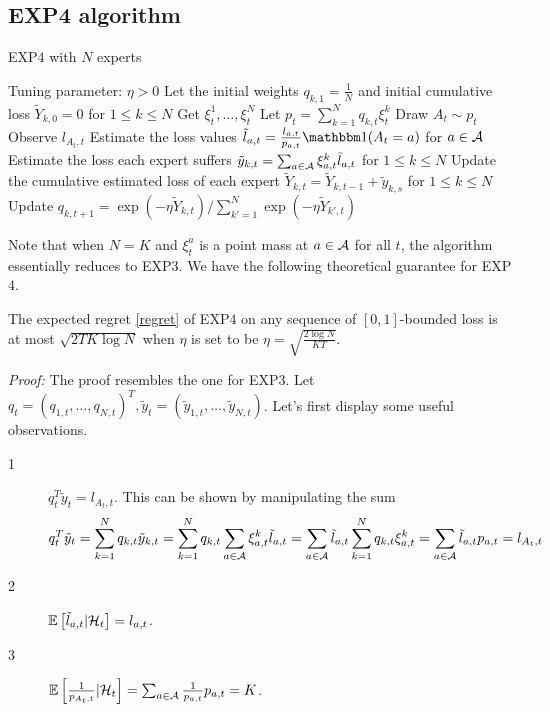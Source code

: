 \documentclass[11pt]{article}
\begin{document}
\subsection{EXP4 algorithm}
\begin{algorithm}
\caption{EXP$4$ with $N$ experts}\label{exp4}
\begin{algorithmic}[1]
\STATE Tuning parameter: $\eta>0$
\STATE Let the initial weights $q_{k,1}=\frac{1}{N}$ and initial cumulative loss $\tilde{Y}_{k,0}=0$ for $1\leq k\leq N$
\STATE Get $\xi_t^1,\ldots,\xi_t^N$
\STATE Let $p_t=\sum_{k=1}^Nq_{k,t}\xi_t^k$
\STATE Draw $A_t\sim p_t$
\STATE Observe $l_{A_t,t}$
\STATE Estimate the loss values $\tilde{l}_{a,t}=\frac{l_{a,t}}{p_{a,t}}\ind{(A_t=a)}$ for $a\in \mathcal{A}$
\STATE Estimate the loss each expert suffers $\tilde{y}_{k,t}=\sum_{a\in \mathcal{A}}\xi_{a,t}^k\tilde{l}_{a,t}$ for $1\leq k\leq N$
\STATE Update the cumulative estimated loss of each expert $\tilde{Y}_{k,t}=\tilde{Y}_{k,t-1}+\tilde{y}_{k,s}$ for $1\leq k\leq N$
\STATE Update $q_{k,t+1}= \exp(-\eta\tilde{Y}_{k,t})/\sum_{k'=1}^N\exp(-\eta\tilde{Y}_{k',t})$
\ENDFOR
\end{algorithmic}
\end{algorithm}
Note that when $N=K$ and $\xi_t^a$ is a point mass at $a\in\mathcal{A}$ for all $t$, the algorithm essentially reduces to EXP$3$. We have the following theoretical guarantee for EXP$4$.
\begin{theorem}
The expected regret \eqref{regret} of EXP$4$ on any sequence of $[0,1]$-bounded loss is at most $\sqrt{2TK\log N}$ when $\eta$ is set to be $\eta=\sqrt{\frac{2\log N}{KT}}$.
\end{theorem}
\textit{Proof: }The proof resembles the one for EXP$3$. Let $q_t=(q_{1,t},\ldots,q_{N,t})^T,\tilde{y}_t=(\tilde{y}_{1,t},\ldots,\tilde{y}_{N,t})$. Let's first display some useful observations.
\begin{description}
\item[1] $q_t^T\tilde{y}_t=l_{A_t,t}$. This can be shown by manipulating the sum
\begin{equation*}
q_t^T\tilde{y}_t=\sum_{k=1}^Nq_{k,t}\tilde{y}_{k,t}=\sum_{k=1}^Nq_{k,t}\sum_{a\in \mathcal{A}}\xi_{a,t}^k\tilde{l}_{a,t}=\sum_{a\in \mathcal{A}}\tilde{l}_{a,t}\sum_{k=1}^Nq_{k,t}\xi_{a,t}^k=\sum_{a\in \mathcal{A}}\tilde{l}_{a,t}p_{a,t}=l_{A_t,t}
\end{equation*}
\item[2] $\mathbb{E}\left[ \tilde{l}_{a,t}\vert \mathcal{H}_t \right]=l_{a,t}$.
\item[3] $\mathbb{E}\left[ \frac{1}{p_{A_t,t}}\vert \mathcal{H}_t \right]=\sum_{a\in \mathcal{A}}\frac{1}{p_{a,t}}p_{a,t}=K$.
\end{description}
\end{document}
